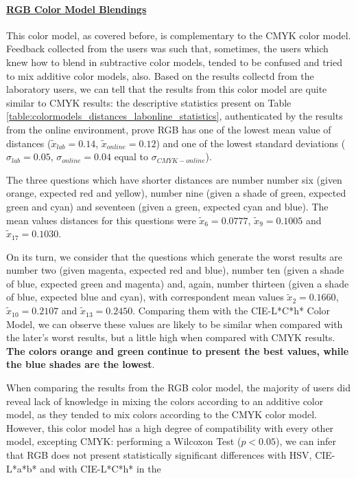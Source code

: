 \paragraph{\ul{RGB Color Model Blendings}}
\label{subsubsec:rgbcolormodel}
%
This color model, as covered before, is complementary to the CMYK color model. Feedback collected from the users was such that, sometimes, the users which knew how to blend in subtractive color models,
tended to be confused and tried to mix additive color models, also. Based on the results collectd from the laboratory users, we can tell that the results from this color model are quite similar to CMYK results: the descriptive statistics present
on Table \ref{table:colormodels_distances_labonline_statistics}, authenticated by the results from the online environment, prove RGB has one of the lowest mean value of distances ($\tilde{x}_{lab} = 0.14$, $\tilde{x}_{online} = 0.12$) and one of
the lowest standard deviations ($\sigma_{lab} = 0.05$, $\sigma_{online} = 0.04$ equal to $\sigma_{CMYK-online}$). \par
%
The three questions which have shorter distances are number number six (given orange, expected red and yellow), number nine (given a shade of green, expected green and cyan) and seventeen (given a green, expected cyan and blue). The mean values
distances for this questions were $\tilde{x}_{6} = 0.0777$, $\tilde{x}_{9} = 0.1005$ and $\tilde{x}_{17} = 0.1030$. \par
%
On its turn, we consider that the questions which generate the worst results are number two (given magenta, expected red and blue), number ten (given a shade of blue, expected green and magenta) and, again, number thirteen (given a shade of blue,
expected blue and cyan), with correspondent mean values $\tilde{x}_{2} = 0.1660$, $\tilde{x}_{10} = 0.2107$ and $\tilde{x}_{13} = 0.2450$.
Comparing them with the CIE-L*C*h* Color Model, we can observe these values are likely to be similar when compared with the later's worst results, but a little high when compared with CMYK results. \textbf{The colors orange and green continue to
present the best values, while the blue shades are the lowest}. \par
%
When comparing the results from the RGB color model, the majority of users did reveal lack of knowledge in mixing the colors according to an additive color model, as they tended to mix colors according to the CMYK color model. However, this color
model has a high degree of compatibility with every other model, excepting CMYK: performing a Wilcoxon Test ($p < 0.05$), we can infer that RGB does not present statistically significant differences with HSV, CIE-L*a*b* and with CIE-L*C*h* in the
